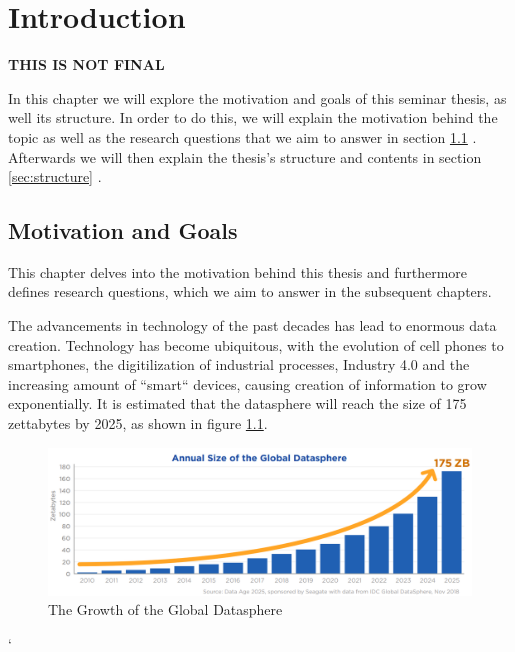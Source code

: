 \chapter{Introduction}
\label{cha:Introduction} %
\textbf{\color{red}THIS IS NOT FINAL}

In this chapter we will explore the motivation and goals of this seminar thesis, as well its structure.
In order to do this, we will explain the motivation behind the topic as well as the research questions that we aim to answer in section \ref{sec:motivation-goals} .
Afterwards we will then explain the thesis's structure and contents in section \ref{sec:structure} .

\section{Motivation and Goals}
\label{sec:motivation-goals}
This chapter delves into the motivation behind this thesis and furthermore defines research questions, which we aim to answer in the subsequent chapters.

The advancements in technology of the past decades has lead to enormous data creation. Technology has become ubiquitous, 
with the evolution of cell phones to smartphones, the digitilization of industrial processes, Industry 4.0
and the increasing amount of ``smart`` devices, causing creation of information to grow exponentially.
It is estimated that the \gls{datasphere} will reach the size of 175 zettabytes by 2025, as shown in figure \ref{fig:growth_datasphere}.
\begin{figure}[ht]
\centering
\includegraphics[width=1.0\textwidth]{Bilder/size_global_datasphere.png}
\caption{The Growth of the Global Datasphere \cite[p.6]{idc-seagate-data}}
\label{fig:growth_datasphere}
\end{figure}`

